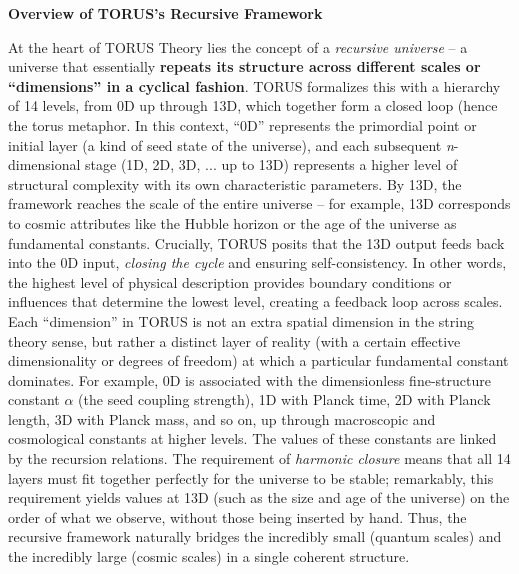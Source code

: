 \documentclass[
]{article}
\begin{document}
\textbf{Overview of TORUS's Recursive Framework}

At the heart of TORUS Theory lies the concept of a \emph{recursive
universe} -- a universe that essentially \textbf{repeats its structure
across different scales or ``dimensions'' in a cyclical fashion}. TORUS
formalizes this with a hierarchy of 14 levels, from 0D up through 13D,
which together form a closed loop (hence the torus metaphor. In this
context, ``0D'' represents the primordial point or initial layer (a kind
of seed state of the universe), and each subsequent \emph{n}-dimensional
stage (1D, 2D, 3D, ... up to 13D) represents a higher level of
structural complexity with its own characteristic parameters. By 13D,
the framework reaches the scale of the entire universe -- for example,
13D corresponds to cosmic attributes like the Hubble horizon or the age
of the universe as fundamental constants\hspace{0pt}. Crucially, TORUS
posits that the 13D output feeds back into the 0D input, \emph{closing
the cycle} and ensuring self-consistency\hspace{0pt}. In other words,
the highest level of physical description provides boundary conditions
or influences that determine the lowest level, creating a feedback loop
across scales. Each ``dimension'' in TORUS is not an extra spatial
dimension in the string theory sense, but rather a distinct layer of
reality (with a certain effective dimensionality or degrees of freedom)
at which a particular fundamental constant dominates. For example, 0D is
associated with the dimensionless fine-structure constant $\alpha$ (the seed
coupling strength), 1D with Planck time, 2D with Planck length, 3D with
Planck mass, and so on, up through macroscopic and cosmological
constants at higher levels\hspace{0pt}. The values of these constants
are linked by the recursion relations. The requirement of \emph{harmonic
closure} means that all 14 layers must fit together perfectly for the
universe to be stable; remarkably, this requirement yields values at 13D
(such as the size and age of the universe) on the order of what we
observe, without those being inserted by hand\hspace{0pt}. Thus, the
recursive framework naturally bridges the incredibly small (quantum
scales) and the incredibly large (cosmic scales) in a single coherent
structure.
\end{document}
